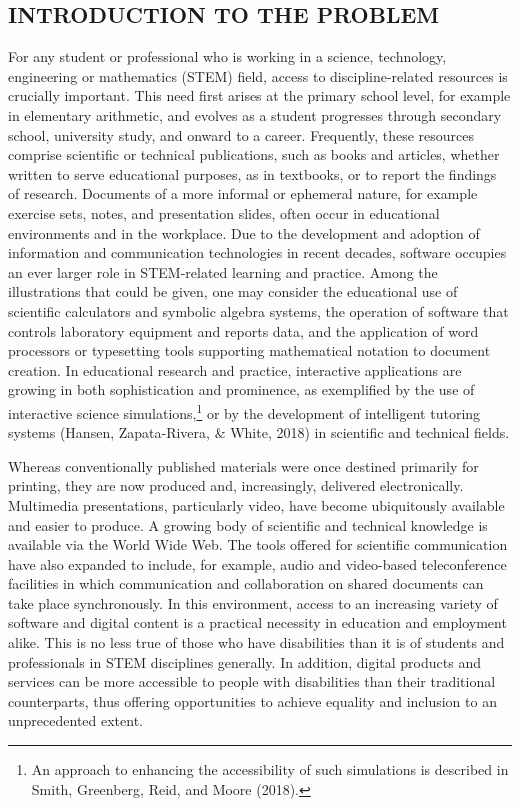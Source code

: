 \documentclass{sig-alternate} %
\begin{document}
\begin{large}
\section*{INTRODUCTION TO THE PROBLEM}

For any student or professional who is working in a science, technology, engineering or mathematics (STEM) field, access to discipline-related resources is crucially important. This need first arises at the primary school level, for example in elementary arithmetic, and evolves as a student progresses through secondary school, university study, and onward to a career. Frequently, these resources comprise scientific or technical publications, such as books and articles, whether written to serve educational purposes, as in textbooks, or to report the findings of research. Documents of a more informal or ephemeral nature, for example exercise sets, notes, and presentation slides, often occur in educational environments and in the workplace. Due to the development and adoption of information and communication technologies in recent decades, software occupies an ever larger role in STEM-related learning and practice. Among the illustrations that could be given, one may consider the educational use of scientific calculators and symbolic algebra systems, the operation of software that controls laboratory equipment and reports data, and the application of word processors or typesetting tools supporting mathematical notation to document creation. In educational research and practice, interactive applications are growing in both sophistication and prominence, as exemplified by the use of interactive science simulations,\footnote{An approach to enhancing the accessibility of such simulations is described in Smith, Greenberg, Reid, and Moore (2018).} or by the development of intelligent tutoring systems (Hansen, Zapata-Rivera, \& White, 2018) in scientific and technical fields.

Whereas conventionally published materials were once destined primarily for printing, they are now produced and, increasingly, delivered electronically. Multimedia presentations, particularly video, have become ubiquitously available and easier to produce. A growing body of scientific and technical knowledge is available via the World Wide Web. The tools offered for scientific communication have also expanded to include, for example, audio and video-based teleconference facilities in which communication and collaboration on shared documents can take place synchronously. In this environment, access to an increasing variety of software and digital content is a practical necessity in education and employment alike. This is no less true of those who have disabilities than it is of students and professionals in STEM disciplines generally. In addition, digital products and services can be more accessible to people with disabilities than their traditional counterparts, thus offering opportunities to achieve equality and inclusion to an unprecedented extent.


\end{large}
\end{document}
